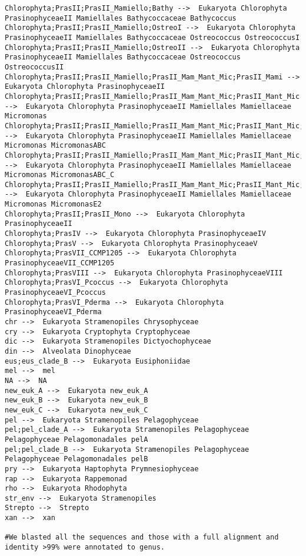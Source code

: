 \documentclass{article}
\begin{document}
\begin{lstlisting}[language=shellcmd,caption={Extracting only Photosynthetic sequences using shell commands}]
Chlorophyta;PrasII;PrasII_Mamiello;Bathy -->  Eukaryota Chlorophyta PrasinophyceaeII Mamiellales Bathycoccaceae Bathycoccus 
Chlorophyta;PrasII;PrasII_Mamiello;OstreoI -->  Eukaryota Chlorophyta PrasinophyceaeII Mamiellales Bathycoccaceae Ostreococcus OstreococcusI
Chlorophyta;PrasII;PrasII_Mamiello;OstreoII -->  Eukaryota Chlorophyta PrasinophyceaeII Mamiellales Bathycoccaceae Ostreococcus OstreococcusII
Chlorophyta;PrasII;PrasII_Mamiello;PrasII_Mam_Mant_Mic;PrasII_Mami -->  Eukaryota Chlorophyta PrasinophyceaeII 
Chlorophyta;PrasII;PrasII_Mamiello;PrasII_Mam_Mant_Mic;PrasII_Mant_Mic -->  Eukaryota Chlorophyta PrasinophyceaeII Mamiellales Mamiellaceae Micromonas 
Chlorophyta;PrasII;PrasII_Mamiello;PrasII_Mam_Mant_Mic;PrasII_Mant_Mic;PrasII_MicroABC -->  Eukaryota Chlorophyta PrasinophyceaeII Mamiellales Mamiellaceae Micromonas MicromonasABC
Chlorophyta;PrasII;PrasII_Mamiello;PrasII_Mam_Mant_Mic;PrasII_Mant_Mic;PrasII_MicroABC;PrasII_MicroABC_C -->  Eukaryota Chlorophyta PrasinophyceaeII Mamiellales Mamiellaceae Micromonas MicromonasABC_C
Chlorophyta;PrasII;PrasII_Mamiello;PrasII_Mam_Mant_Mic;PrasII_Mant_Mic;PrasII_MicroE2 -->  Eukaryota Chlorophyta PrasinophyceaeII Mamiellales Mamiellaceae Micromonas MicromonasE2
Chlorophyta;PrasII;PrasII_Mono -->  Eukaryota Chlorophyta PrasinophyceaeII 
Chlorophyta;PrasIV -->  Eukaryota Chlorophyta PrasinophyceaeIV 
Chlorophyta;PrasV -->  Eukaryota Chlorophyta PrasinophyceaeV 
Chlorophyta;PrasVII_CCMP1205 -->  Eukaryota Chlorophyta PrasinophyceaeVII_CCMP1205 
Chlorophyta;PrasVIII -->  Eukaryota Chlorophyta PrasinophyceaeVIII 
Chlorophyta;PrasVI_Pcoccus -->  Eukaryota Chlorophyta PrasinophyceaeVI_Pcoccus 
Chlorophyta;PrasVI_Pderma -->  Eukaryota Chlorophyta PrasinophyceaeVI_Pderma 
chr -->  Eukaryota Stramenopiles Chrysophyceae 
cry -->  Eukaryota Cryptophyta Cryptophyceae 
dic -->  Eukaryota Stramenopiles Dictyochophyceae 
din -->  Alveolata Dinophyceae
eus;eus_clade_B -->  Eukaryota Eusiphoniidae 
mel -->  mel 
NA -->  NA 
new_euk_A -->  Eukaryota new_euk_A 
new_euk_B -->  Eukaryota new_euk_B 
new_euk_C -->  Eukaryota new_euk_C 
pel -->  Eukaryota Stramenopiles Pelagophyceae 
pel;pel_clade_A -->  Eukaryota Stramenopiles Pelagophyceae Pelagophyceae Pelagomonadales pelA 
pel;pel_clade_B -->  Eukaryota Stramenopiles Pelagophyceae Pelagophyceae Pelagomonadales pelB 
pry -->  Eukaryota Haptophyta Prymnesiophyceae
rap -->  Eukaryota Rappemonad 
rho -->  Eukaryota Rhodophyta 
str_env -->  Eukaryota Stramenopiles
Strepto -->  Strepto 
xan -->  xan

#We blasted all the sequences and those with a full alignment and identity >99% were annotated to genus. 


\end{lstlisting}
\end{document}
